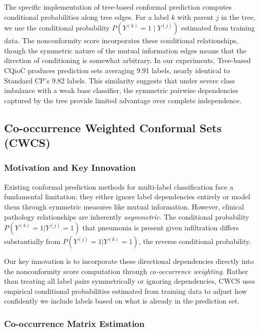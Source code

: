The specific implementation of tree-based conformal prediction computes conditional probabilities along tree edges.
For a label $k$ with parent $j$ in the tree, we use the conditional probability $P(Y^{(k)} = 1 \mid Y^{(j)})$ estimated from training data.
The nonconformity score incorporates these conditional relationships, though the symmetric nature of the mutual information edges means that the direction of conditioning is somewhat arbitrary.
In our experiments, Tree-based CQioC produces prediction sets averaging 9.91 labels, nearly identical to Standard CP's 9.82 labels.
This similarity suggests that under severe class imbalance with a weak base classifier, the symmetric pairwise dependencies captured by the tree provide limited advantage over complete independence.

\subsection{Co-occurrence Weighted Conformal Sets (CWCS)}\label{subsec:co-occurrence-weighted-conformal-sets-(cwcs)}

\subsubsection{Motivation and Key Innovation}

Existing conformal prediction methods for multi-label classification face a fundamental limitation: they either ignore label dependencies entirely or model them through symmetric measures like mutual information. However, clinical pathology relationships are inherently \emph{asymmetric}. The conditional probability $P(Y^{(k)} = 1 | Y^{(j)} = 1)$ that pneumonia is present given infiltration differs substantially from $P(Y^{(j)} = 1 | Y^{(k)} = 1)$, the reverse conditional probability.

Our key innovation is to incorporate these directional dependencies directly into the nonconformity score computation through \emph{co-occurrence weighting}. Rather than treating all label pairs symmetrically or ignoring dependencies, CWCS uses empirical conditional probabilities estimated from training data to adjust how confidently we include labels based on what is already in the prediction set.

\subsubsection{Co-occurrence Matrix Estimation}

